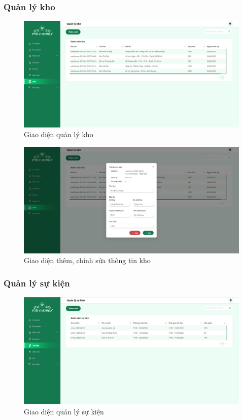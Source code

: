 \subsubsection{Quản lý kho}
\begin{figure}[!htp]
    \centering
    \includegraphics[width=12cm]{img/UI/admin_implement/warehouse.png}
    \newline
    \caption{Giao diện quản lý kho}
\end{figure}


\begin{figure}[!htp]
    \centering
    \includegraphics[width=12cm]{img/UI/admin_implement/warehouseEdit.png}
    \newline
    \caption{Giao diện thêm, chỉnh sửa thông tin kho}
\end{figure}


\newpage


\subsubsection{Quản lý sự kiện}
\begin{figure}[!htp]
    \centering
    \includegraphics[width=12cm]{img/UI/admin_implement/event.png}
    \newline
    \caption{Giao diện quản lý sự kiện}
\end{figure}


